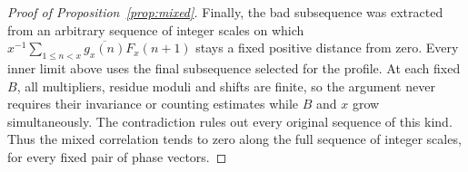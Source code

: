 \begin{proof}[Proof of Proposition~\ref{prop:mixed}]
Finally, the bad subsequence was extracted from an arbitrary sequence
of integer scales on which
$x^{-1}\sum_{1\le n<x}\overline{g_x(n)}F_x(n+1)$ stays a fixed
positive distance from zero.  Every inner limit above uses the final
subsequence selected for the profile.  At each fixed $B$, all multipliers,
residue moduli and shifts are finite, so the argument never requires their
invariance or counting estimates while $B$ and $x$ grow simultaneously.
The contradiction rules out every original sequence of this kind.  Thus
the mixed correlation tends to zero along the
full sequence of integer scales, for every fixed pair of phase vectors.
\end{proof}
